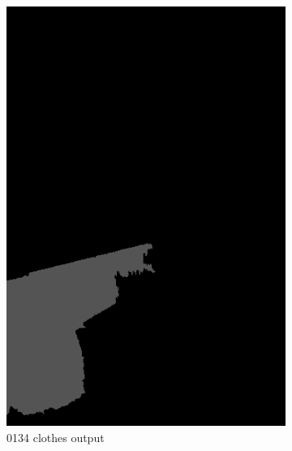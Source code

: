 \documentclass{csc_assignment5}
\begin{document}
\begin{description}
\begin{figure}[h!]
    \centering
    \begin{subfigure}[b]{0.3\textwidth}
        \includegraphics[width=\textwidth]{results-seg/0134_clothes.png}
        \caption{0134 clothes output}
    \end{subfigure}
    \quad
    \begin{subfigure}[b]{0.3\textwidth}

\end{subfigure}
\end{figure}
\end{description}
\end{document}
